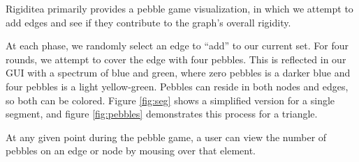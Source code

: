 \documentclass[aps,prd,final,twocolumn,letterpaper,nofootinbib]{revtex4-1}
\begin{document}
Rigiditea primarily provides a pebble game visualization,
in which we attempt to add edges and see if they contribute
to the graph's overall rigidity.

At each phase, we randomly select an edge to ``add'' to our current set.
For four rounds, we attempt to cover the edge with four pebbles.
This is reflected in our GUI with a spectrum of blue and green,
where zero pebbles is a darker blue and four pebbles is a light yellow-green.
Pebbles can reside in both nodes and edges,
so both can be colored.
Figure \ref{fig:seg} shows a simplified version for a single segment,
and figure \ref{fig:pebbles} demonstrates this process
for a triangle.

At any given point during the pebble game,
a user can view the number of pebbles on an edge or node by
mousing over that element.
\end{document}
